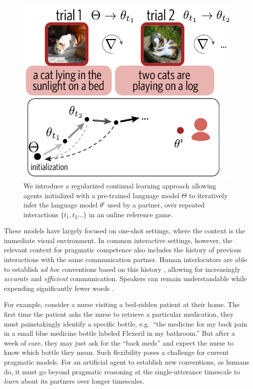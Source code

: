 \documentclass[11pt,a4paper]{article}
\begin{document}
\begin{figure}[t!]
\includegraphics[scale=.6]{../figures/frontfig.pdf}
\caption{We introduce a regularized continual learning approach allowing agents initialized with a pre-trained language model $\Theta$ to iteratively infer the language model $\theta^i$ used by a partner, over repeated interactions $\{t_1, t_2\dots\}$ in an online reference game.}
\vspace{-1em}
\label{fig:refgame}
\end{figure}

These models have largely focused on one-shot settings, where the context is the immediate visual environment.
In common interactive settings, however, the relevant context for pragmatic competence also includes the history of previous interactions with the same communication partner.
Human interlocutors are able to establish \emph{ad hoc} conventions based on this history \cite{ClarkWilkesGibbs86_ReferringCollaborative,clark1996using}, allowing for increasingly \emph{accurate} and \emph{efficient} communication. 
Speakers can remain understandable while expending significantly fewer words \cite{KraussWeinheimer64_ReferencePhrases,orita2015discourse,staliunaite_getting_2018, hawkins2019characterizing, stewart_characterizing_2020}. 

For example, consider a nurse visiting a bed-ridden patient at their home.
The first time the patient asks the nurse to retrieve a particular medication, they must painstakingly identify a specific bottle, e.g.~``the medicine for my back pain in a small blue medicine bottle labeled Flexeril in my bathroom.''
But after a week of care, they may just ask for the ``back meds'' and expect the nurse to know which bottle they mean.
Such flexibility poses a challenge for current pragmatic models. 
For an artificial agent to establish new conventions, as humans do, it must go beyond pragmatic reasoning at the single-utterance timescale to \emph{learn} about its partners over longer timescales. 
\end{document}
